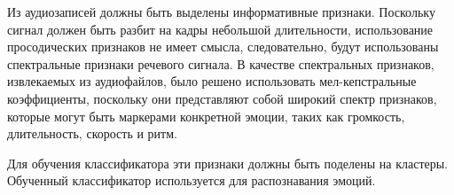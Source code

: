 Из аудиозаписей должны быть выделены информативные признаки. Поскольку сигнал должен быть разбит на кадры небольшой длительности, использование просодических признаков не имеет смысла, следовательно, будут использованы спектральные признаки речевого сигнала. В качестве спектральных признаков, извлекаемых из аудиофайлов, было решено использовать мел-кепстральные коэффициенты, поскольку они представляют собой широкий спектр признаков, которые могут быть маркерами конкретной эмоции, таких как громкость, длительность, скорость и ритм.

Для обучения классификатора эти признаки должны быть поделены на кластеры. Обученный классификатор используется для распознавания эмоций.
